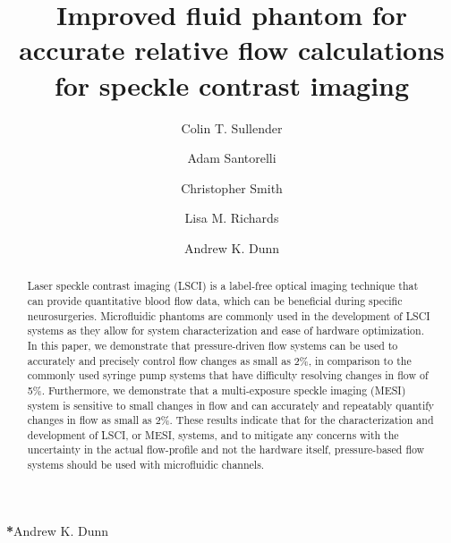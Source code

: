 \documentclass[12pt]{spieman}
\title{Improved fluid phantom for accurate relative flow calculations for speckle contrast imaging}
\author[a]{Colin T. Sullender}
\author[a]{Adam Santorelli}
\author[a]{Christopher Smith}
\author[a]{Lisa M. Richards}
\author[a,*]{Andrew K. Dunn}
\affil[a]{Department of Biomedical Engineering, The University of Texas at Austin, Austin, TX, 78712, USA}
\begin{document}
\maketitle


\begin{abstract}
Laser speckle contrast imaging (LSCI) is a label-free optical imaging technique that can provide quantitative blood flow data, which can be beneficial during specific neurosurgeries. Microfluidic phantoms are commonly used in the development of LSCI systems as they allow for system characterization and ease of hardware optimization. In this paper, we demonstrate that pressure-driven flow systems can be used to accurately and precisely control flow changes as small as 2\%, in comparison to the commonly used syringe pump systems that have difficulty resolving changes in flow of 5\%. Furthermore, we demonstrate that a multi-exposure speckle imaging (MESI) system is sensitive to small changes in flow and can accurately and repeatably quantify changes in flow as small as 2\%. These results indicate that for the characterization and development of LSCI, or MESI, systems, and to mitigate any concerns with the uncertainty in the actual flow-profile and not the hardware itself, pressure-based flow systems should be used with microfluidic channels.
\end{abstract}


{\noindent \footnotesize\textbf{*}Andrew K. Dunn }
\end{document}
